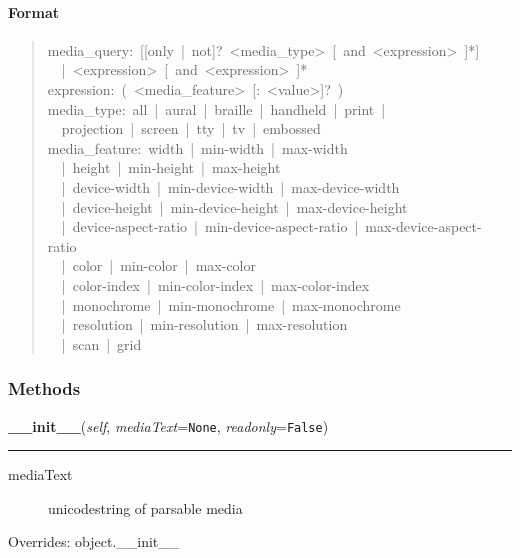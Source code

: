 \paragraph*{Format}
\label{format}
\begin{quote}{\ttfamily \raggedright \noindent
media{\_}query:~{[}{[}only~|~not{]}?~<media{\_}type>~{[}~and~<expression>~{]}*{]}~\\
~~|~<expression>~{[}~and~<expression>~{]}*~\\
expression:~(~<media{\_}feature>~{[}:~<value>{]}?~)~\\
media{\_}type:~all~|~aural~|~braille~|~handheld~|~print~|~\\
~~projection~|~screen~|~tty~|~tv~|~embossed~\\
media{\_}feature:~width~|~min-width~|~max-width~\\
~~|~height~|~min-height~|~max-height~\\
~~|~device-width~|~min-device-width~|~max-device-width~\\
~~|~device-height~|~min-device-height~|~max-device-height~\\
~~|~device-aspect-ratio~|~min-device-aspect-ratio~|~max-device-aspect-ratio~\\
~~|~color~|~min-color~|~max-color~\\
~~|~color-index~|~min-color-index~|~max-color-index~\\
~~|~monochrome~|~min-monochrome~|~max-monochrome~\\
~~|~resolution~|~min-resolution~|~max-resolution~\\
~~|~scan~|~grid
}\end{quote}


  \subsubsection{Methods}

    \vspace{0.5ex}

\hspace{.8\funcindent}\begin{boxedminipage}{\funcwidth}

    \raggedright \textbf{\_\_init\_\_}(\textit{self}, \textit{mediaText}={\tt None}, \textit{readonly}={\tt False})

    \vspace{-1.5ex}

    \rule{\textwidth}{0.5\fboxrule}
\setlength{\parskip}{2ex}
\begin{description}
\item[{mediaText}] \leavevmode 
unicodestring of parsable media

\end{description}
\setlength{\parskip}{1ex}
      Overrides: object.\_\_init\_\_

    \end{boxedminipage}

